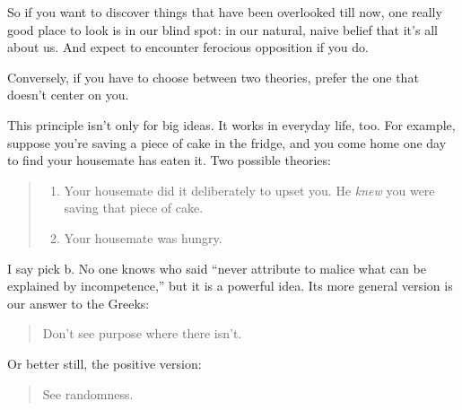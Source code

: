 So if you want to discover things that have been overlooked till now,
one really good place to look is in our blind spot: in our natural,
naive belief that it's all about us. And expect to encounter ferocious
opposition if you do.

Conversely, if you have to choose between two theories, prefer the one
that doesn't center on you.

This principle isn't only for big ideas. It works in everyday life, too.
For example, suppose you're saving a piece of cake in the fridge, and
you come home one day to find your housemate has eaten it. Two possible
theories:

\begin{quote}
\begin{enumerate}
\def\labelenumi{\alph{enumi})}
\item
  Your housemate did it deliberately to upset you. He \emph{knew} you
  were saving that piece of cake.
\item
  Your housemate was hungry.
\end{enumerate}
\end{quote}

I say pick b. No one knows who said ``never attribute to malice what can
be explained by incompetence,'' but it is a powerful idea. Its more
general version is our answer to the Greeks:

\begin{quote}
Don't see purpose where there isn't.
\end{quote}

Or better still, the positive version:

\begin{quote}
See randomness.
\end{quote}
